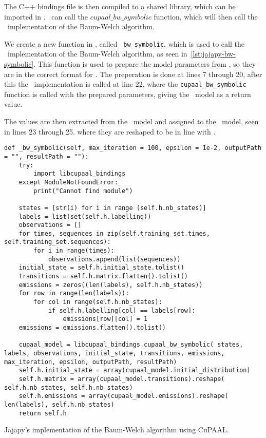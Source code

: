 The C++ bindings file is then compiled to a shared library, which can be imported in \Jajapy.
\Jajapy\ can call the $cupaal\_bw\_symbolic$ function, which will then call the \Cupaal\ implementation of the Baum-Welch algorithm.

We create a new function in \Jajapy, called \texttt{\_bw\_symbolic}, which is used to call the \Cupaal\ implementation of the Baum-Welch algorithm, as seen in~\autoref{lst:jajapy-bw-symbolic}.
This function is used to prepare the model parameters from \Jajapy, so they are in the correct format for \Cupaal.
The preperation is done at lines 7 through 20, after this the \Cupaal\ implementation is called at line 22, where the \texttt{cupaal\_bw\_symbolic} function is called with the prepared parameters, giving the \Cupaal\ model as a return value.

The values are then extracted from the \Cupaal\ model and assigned to the \Jajapy\ model, seen in lines 23 through 25. where they are reshaped to be in line with \Jajapy.

\begin{listing*}
    \begin{verbatim}
def _bw_symbolic(self, max_iteration = 100, epsilon = 1e-2, outputPath = "", resultPath = ""):
    try:
        import libcupaal_bindings
    except ModuleNotFoundError:
        print("Cannot find module")

    states = [str(i) for i in range (self.h.nb_states)]
    labels = list(set(self.h.labelling))
    observations = []
    for times, sequences in zip(self.training_set.times, self.training_set.sequences):
        for i in range(times):
            observations.append(list(sequences))
    initial_state = self.h.initial_state.tolist()
    transitions = self.h.matrix.flatten().tolist()
    emissions = zeros((len(labels), self.h.nb_states))
    for row in range(len(labels)):
        for col in range(self.h.nb_states):
            if self.h.labelling[col] == labels[row]:
                emissions[row][col] = 1
    emissions = emissions.flatten().tolist()

    cupaal_model = libcupaal_bindings.cupaal_bw_symbolic( states, labels, observations, initial_state, transitions, emissions, max_iteration, epsilon, outputPath, resultPath)
    self.h.initial_state = array(cupaal_model.initial_distribution)
    self.h.matrix = array(cupaal_model.transitions).reshape( self.h.nb_states, self.h.nb_states)
    self.h.emissions = array(cupaal_model.emissions).reshape( len(labels), self.h.nb_states)
    return self.h
      \end{verbatim}
    \caption{Jajapy's implementation of the Baum-Welch algorithm using CuPAAL.}
    \label{lst:jajapy-bw-symbolic}
\end{listing*}


